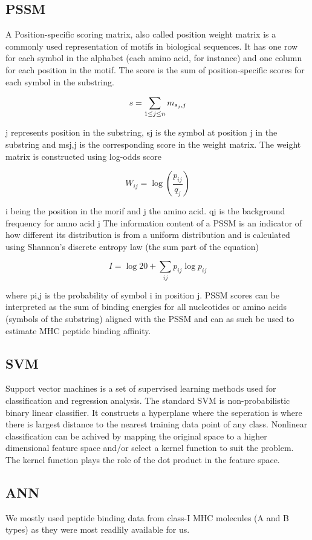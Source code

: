 
\subsection*{PSSM}
A Position-specific scoring matrix, also called position weight matrix is a commonly used representation of motifs in biological sequences. It has one row for each symbol in the alphabet (each amino acid, for instance) and one column for each position in the motif. The score is the sum of position-specific scores for each symbol in the substring.

\begin{equation}
s = \sum_{1\leq j\leq n}{m_{s_j,j}} \\
\end{equation}

j represents position in the substring, sj is the symbol at position j in the substring and msj,j is the corresponding score in the weight matrix. The weight matrix is constructed using log-odds score

\begin{equation}
W_{ij} = \log{ (\frac{p_{ij}}{q_j}) }
\end{equation}

i being the position in the morif and j the amino acid. qj is the background frequency for amno acid j
The information content of a PSSM is an indicator of how different its distribution is from a uniform distribution and is calculated using Shannon's discrete entropy law (the sum part of the equation)

\begin{equation}
I = \log{ 20 } + \sum_{ij}{ p_{ij}\log{p_{ij}} }
\end{equation}

where pi,j is the probability of symbol i in position j.
PSSM scores can be interpreted as the sum of binding energies for all nucleotides or amino acids (symbols of the substring) aligned with the PSSM and can as such be used to estimate MHC peptide binding affinity.

\subsection*{SVM}
Support vector machines is a set of supervised learning methods used for classification and regression analysis. The standard SVM is non-probabilistic binary linear classifier. It constructs a hyperplane where the seperation is where there is largest distance to the nearest training data point of any class. Nonlinear classification can be achived by  mapping the original space to a higher dimensional feature space and/or select a kernel function to suit the problem. The kernel function plays the role of the dot product in the feature space.

\subsection*{ANN}
We mostly used peptide binding data from class-I MHC molecules (A and B types) as they were most readlily available for us.
